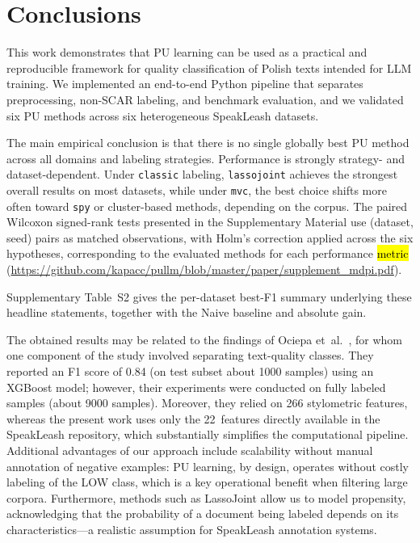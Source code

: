 \documentclass[applsci,article,accept,pdftex,moreauthors]{Definitions/mdpi}
\newcommand{\rev}[1]{{#1}}
\begin{document}
\section{Conclusions}

This work demonstrates that PU learning can be used as a practical and reproducible framework for quality classification of Polish texts intended for LLM training. We implemented an end-to-end Python pipeline that separates preprocessing, non-SCAR labeling, and benchmark evaluation, and we validated six PU methods across six heterogeneous SpeakLeash datasets.

\rev{The main empirical conclusion is that there is no single globally best PU method across all domains and labeling strategies. Performance is strongly strategy- and dataset-dependent. Under \texttt{classic} labeling, \texttt{lassojoint} achieves the strongest overall results on most datasets, while under \texttt{mvc}, the best choice shifts more often toward \texttt{spy} or cluster-based methods, depending on the corpus. The paired Wilcoxon signed-rank tests presented in the Supplementary Material use (dataset, seed) pairs as matched observations, with Holm's correction applied across the six hypotheses, corresponding to the evaluated methods for each performance \hl{metric} %
 (\url{https://github.com/kapacc/pullm/blob/master/paper/supplement_mdpi.pdf}).}

Supplementary Table~S2 gives the per-dataset best-F1 summary underlying these headline statements, together with the Naive baseline and absolute gain.

The obtained results may be related to the findings of Ociepa et~al.~\cite{bielik7b}, for whom one component of the study involved separating text-quality classes. They reported an F1 score of 0.84 (on test subset about 1000 samples) using an XGBoost model; however, their experiments were conducted on fully labeled samples (about 9000 samples). Moreover, they relied on 266 stylometric features, whereas the present work uses only the 22~features directly available in the SpeakLeash repository, which substantially simplifies the computational pipeline. Additional advantages of our approach include scalability without manual annotation of negative examples: PU learning, by design, operates without costly labeling of the LOW class, which is a key operational benefit when filtering large corpora. Furthermore, methods such as LassoJoint allow us to model propensity, acknowledging that the probability of a document being labeled depends on its characteristics---a realistic assumption for SpeakLeash annotation systems.
\end{document}
